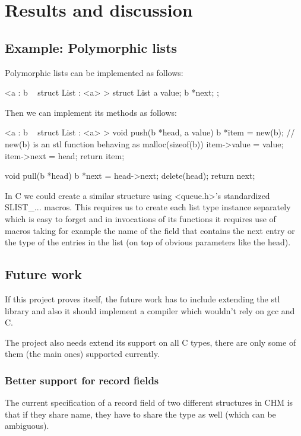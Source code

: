 
\chapter{Results and discussion}

\section{Example: Polymorphic lists}

Polymorphic lists can be implemented as follows:

<a : b ~ struct List : <a> >
struct List
{
    a value;
    b *next;
};

Then we can implement its methods as follows:

<a : b ~ struct List : <a> >
void push(b *head, a value)
{
    b *item = new(b); // new(b) is an stl function behaving as malloc(sizeof(b))
    item->value = value;
    item->next = head;
    return item;
}

void pull(b *head)
{
    b *next = head->next;
    delete(head);
    return next;
}

In C we could create a similar structure using <queue.h>'s standardized SLIST_... macros.
This requires us to create each list type instance separately which is easy to forget
and in invocations of its functions it requires use of macros taking for example the name of the field that
contains the next entry or the type of the entries in the list (on top of obvious parameters like the head).

\section{Future work}

If this project proves itself, the future work has to include extending the stl library and also
it should implement a compiler which wouldn't rely on gcc and C.

The project also needs extend its support on all C types, there are only some of them (the main ones)
supported currently.

\subsection{Better support for record fields}

The current specification of a record field of two different structures in CHM is that if they share name, they have to share the type as well
(which can be ambiguous).

